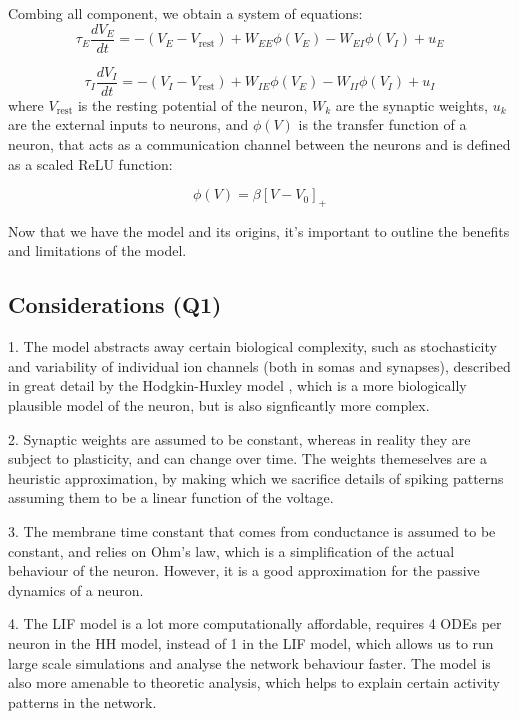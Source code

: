 \documentclass[10pt,twocolumn]{article}
\begin{document}
Combing all component, we obtain a system of equations:
\begin{equation}
    \tau_E \frac{dV_E}{dt} =
    -(V_E - V_{\text{rest}})
    + W_{EE} \phi(V_E)
    - W_{EI} \phi(V_I) + u_E
\end{equation}

\begin{equation}
    \tau_I \frac{dV_I}{dt} =
    -(V_I - V_{\text{rest}})
    + W_{IE} \phi(V_E)
    - W_{II} \phi(V_I) + u_I
\end{equation}
where $V_{\text{rest}}$ is the resting potential of the neuron, $W_{k}$ are the
synaptic weights, $u_k$ are the external inputs to neurons,
and $\phi(V)$ is the transfer function of a neuron, that acts as
a communication channel between the neurons and is defined as a scaled ReLU function:

\begin{equation}
    \phi(V) = \beta[V-V_0]_+
\end{equation}

Now that we have the model and its origins, it's important to outline
the benefits and limitations of the model.

\subsection{Considerations (Q1)}
1. The model abstracts away certain biological complexity, such as stochasticity and
variability of individual ion channels (both in somas and synapses), described in
great detail by the Hodgkin-Huxley model \cite{hodgkin1952quantitative}, which is
a more biologically plausible model of the neuron,
but is also signficantly more complex.

2. Synaptic weights are assumed to be constant, whereas in reality they are
subject to plasticity, and can change over time.
The weights themeselves are a heuristic approximation,
by making which we sacrifice details of
spiking patterns assuming them to be a linear function of the voltage.

3. The membrane time constant that comes from conductance is assumed
to be constant, and relies on Ohm's law, which is a simplification of
the actual behaviour of the neuron.
However, it is a good approximation for the passive dynamics of a neuron.

4. The LIF model is a lot more computationally affordable, requires 4 ODEs
per neuron in the HH model, instead of 1 in the LIF model,
which allows us to run large scale simulations and analyse
the network behaviour faster. The model is also more amenable
to theoretic analysis, which helps to explain certain activity patterns in the network.
\end{document}
